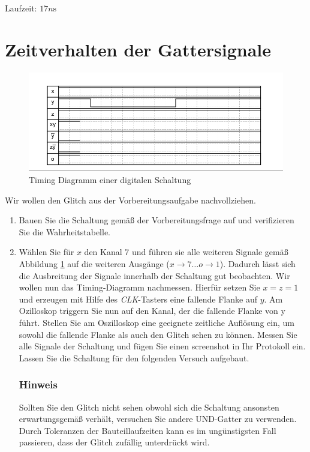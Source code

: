 \documentclass[10pt]{scrreprt}
\begin{document}
    Laufzeit: $17\si{n\second}$

    \section{Zeitverhalten der Gattersignale}
    \begin{figure}[H]
        \includegraphics[width=\textwidth]{abb13.png}
        \caption{Timing Diagramm einer digitalen Schaltung}
        \label{fig:abb13}
    \end{figure}
    Wir wollen den Glitch aus der Vorbereitungsaufgabe nachvollziehen.
    \begin{enumerate}
        \item Bauen Sie die Schaltung gemäß der Vorbereitungsfrage auf und verifizieren Sie die
            Wahrheitstabelle.
        \item Wählen Sie für $x$ den Kanal 7 und führen sie alle weiteren Signale gemäß Abbildung
            \ref{fig:abb13} auf die weiteren Ausgänge ($x \rightarrow 7 \ldots o \rightarrow 1$). Dadurch lässt sich die Ausbreitung
            der Signale innerhalb der Schaltung gut beobachten.
            Wir wollen nun das Timing-Diagramm nachmessen. Hierfür setzen Sie $x = z = 1$
            und erzeugen mit Hilfe des \textit{CLK}-Tasters eine fallende Flanke auf $y$. Am Ozilloskop
            triggern Sie nun auf den Kanal, der die fallende Flanke von y führt. Stellen Sie am
            Oszilloskop eine geeignete zeitliche Auflösung ein, um sowohl die fallende Flanke
            als auch den Glitch sehen zu können. Messen Sie alle Signale der Schaltung und
            fügen Sie einen screenshot in Ihr Protokoll ein. Lassen Sie die Schaltung für den
            folgenden Versuch aufgebaut.
            \subsubsection{Hinweis}
            Sollten Sie den Glitch nicht sehen obwohl sich die Schaltung ansonsten erwartungsgemäß verhält,
            versuchen Sie andere UND-Gatter zu verwenden. Durch Toleranzen
            der Bauteillaufzeiten kann es im \glqq{}ungünstigsten\grqq{} Fall passieren, dass der Glitch
            zufällig unterdrückt wird.
    \end{enumerate}
\end{document}
